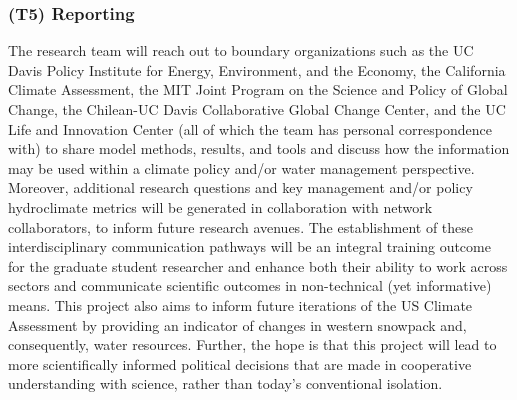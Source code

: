 \documentclass[11pt]{article}
\begin{document}


\subsubsection{(T5) Reporting}

The research team will reach out to boundary organizations such as the UC Davis Policy Institute for Energy, Environment, and the Economy, the California Climate Assessment, the MIT Joint Program on the Science and Policy of Global Change, the Chilean-UC Davis Collaborative Global Change Center, and the UC Life and Innovation Center (all of which the team has personal correspondence with) to share model methods, results, and tools and discuss how the information may be used within a climate policy and/or water management perspective.  Moreover, additional research questions and key management and/or policy hydroclimate metrics will be generated in collaboration with network collaborators, to inform future research avenues.  The establishment of these interdisciplinary communication pathways will be an integral training outcome for the graduate student researcher and enhance both their ability to work across sectors and communicate scientific outcomes in non-technical (yet informative) means.  This project also aims to inform future iterations of the US Climate Assessment by providing an indicator of changes in western snowpack and, consequently, water resources.  Further, the hope is that this project will lead to more scientifically informed political decisions that are made in cooperative understanding with science, rather than today's conventional isolation.

\end{document}

